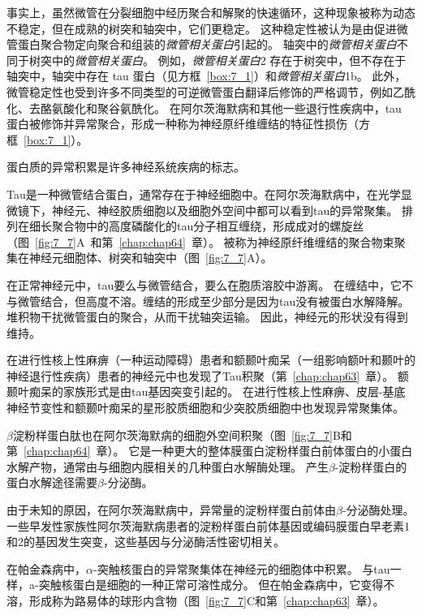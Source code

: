 事实上，虽然微管在分裂细胞中经历聚合和解聚的快速循环，这种现象被称为动态不稳定，但在成熟的树突和轴突中，它们更稳定。
这种稳定性被认为是由促进微管蛋白聚合物定向聚合和组装的\textit{微管相关蛋白}引起的。
轴突中的\textit{微管相关蛋白}不同于树突中的\textit{微管相关蛋白}。
例如，\textit{微管相关蛋白}2 存在于树突中，但不存在于轴突中，轴突中存在 tau 蛋白（见方框~\ref{box:7_1}）和\textit{微管相关蛋白}1b。
此外，微管稳定性也受到许多不同类型的可逆微管蛋白翻译后修饰的严格调节，例如乙酰化、去酪氨酸化和聚谷氨酰化。
在阿尔茨海默病和其他一些退行性疾病中，tau 蛋白被修饰并异常聚合，形成一种称为神经原纤维缠结的特征性损伤（方框~\ref{box:7_1}）。


\begin{proposition}[神经解剖学导航术语] \label{box:7_1}
	
	\quad \quad 蛋白质的异常积累是许多神经系统疾病的标志。
	
	\quad \quad Tau是一种微管结合蛋白，通常存在于神经细胞中。在阿尔茨海默病中，在光学显微镜下，神经元、神经胶质细胞以及细胞外空间中都可以看到tau的异常聚集。
	排列在细长聚合物中的高度磷酸化的tau分子相互缠绕，形成成对的螺旋丝（图~\ref{fig:7_7}A~和第~\ref{chap:chap64}~章）。
	被称为神经原纤维缠结的聚合物束聚集在神经元细胞体、树突和轴突中（图~\ref{fig:7_7}A）。
	
	\quad \quad 在正常神经元中，tau要么与微管结合，要么在胞质溶胶中游离。
	在缠结中，它不与微管结合，但高度不溶。缠结的形成至少部分是因为tau没有被蛋白水解降解。
	堆积物干扰微管蛋白的聚合，从而干扰轴突运输。
	因此，神经元的形状没有得到维持。
	
	\quad \quad 在进行性核上性麻痹（一种运动障碍）患者和额颞叶痴呆（一组影响额叶和颞叶的神经退行性疾病）患者的神经元中也发现了Tau积聚（第~\ref{chap:chap63}~章）。
	额颞叶痴呆的家族形式是由tau基因突变引起的。
	在进行性核上性麻痹、皮层-基底神经节变性和额颞叶痴呆的星形胶质细胞和少突胶质细胞中也发现异常聚集体。
	
	\quad \quad $\beta$淀粉样蛋白肽也在阿尔茨海默病的细胞外空间积聚（图~\ref{fig:7_7}B和第~\ref{chap:chap64}~章）。
	它是一种更大的整体膜蛋白淀粉样蛋白前体蛋白的小蛋白水解产物，通常由与细胞内膜相关的几种蛋白水解酶处理。
	产生$\beta$-淀粉样蛋白的蛋白水解途径需要$\beta$-分泌酶。
	
	\quad \quad 由于未知的原因，在阿尔茨海默病中，异常量的淀粉样蛋白前体由$\beta$-分泌酶处理。
	一些早发性家族性阿尔茨海默病患者的淀粉样蛋白前体基因或编码膜蛋白早老素1和2的基因发生突变，这些基因与分泌酶活性密切相关。
	
	\quad \quad 在帕金森病中，$\alpha$-突触核蛋白的异常聚集体在神经元的细胞体中积累。
	与tau一样，a-突触核蛋白是细胞的一种正常可溶性成分。
	但在帕金森病中，它变得不溶，形成称为路易体的球形内含物（图~\ref{fig:7_7}C和第~\ref{chap:chap63}~章）。
	

\end{proposition}
